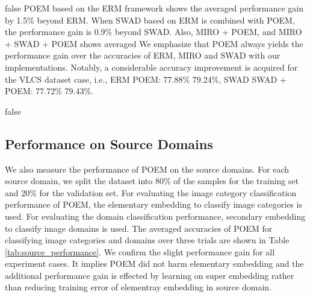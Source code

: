 \documentclass[letterpaper]{article} \usepackage{aaai23}  \usepackage{times}  \usepackage{helvet}  \usepackage{courier}  \usepackage[hyphens]{url}  \usepackage{graphicx} \urlstyle{rm} \def\UrlFont{\rm}  \usepackage{natbib}  \usepackage{caption} \frenchspacing  \setlength{\pdfpagewidth}{8.5in}  \setlength{\pdfpageheight}{11in}  \usepackage[labelsep=period]{caption}
\begin{document}
\if false
POEM based on the ERM framework shows the averaged performance gain by 1.5\% beyond ERM. When SWAD based on ERM is combined with POEM, the performance gain is 0.9\% beyond SWAD. Also, MIRO + POEM, and MIRO + SWAD + POEM shows averaged 
We emphasize that POEM always yields the performance gain over the accuracies of ERM, MIRO and SWAD with our implementations.
Notably, a considerable accuracy improvement is acquired for the VLCS dataset case, i.e., ERM  POEM: 77.88\%  79.24\%, SWAD  SWAD + POEM: 77.72\%  79.43\%.
\fi

\if false
\subsection{Performance on Source Domains}
We also measure the performance of POEM on the source domains. For each source domain, we split the dataset into 80\% of the samples for the training set and 20\% for the validation set. For evaluating the image category classification performance of POEM, the elementary embedding to classify image categories is used. For evaluating the domain classification performance, secondary embedding to classify image domains is used.
The averaged accuracies of POEM for classifying image categories and domains over three trials are shown in Table \ref{tab:source_performance}. We confirm the slight performance gain for all experiment cases. It implies POEM did not harm elementary embedding and the additional performance gain is effected by learning on super embedding rather than reducing training error of elementray embedding in source domain.
\end{document}
